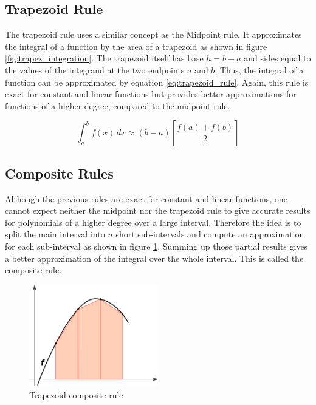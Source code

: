 \subsection{Trapezoid Rule}
The trapezoid rule uses a similar concept as the Midpoint rule. It approximates the integral of a function by the area of a trapezoid as shown in figure \ref{fig:trapez_integration}. The trapezoid itself has base $h = b - a$ and sides equal to the values of the integrand at the two endpoints $a$ and $b$. Thus, the integral of a function can be approximated by equation \ref{eq:trapezoid_rule}. Again, this rule is exact for constant and linear functions but provides better approximations for functions of a higher degree, compared to the midpoint rule.

\begin{equation}
 \int_{a}^{b} f(x)\, dx \approx (b-a) \left[\frac{f(a) + f(b)}{2} \right]
 \label{eq:trapezoid_rule}
\end{equation}



\subsection{Composite Rules}
Although the previous rules are exact for constant and linear functions, one cannot expect neither the midpoint nor the trapezoid rule to give accurate results for polynomials of a higher degree over a large interval. Therefore the idea is to split the main interval into $n$ short sub-intervals and compute an approximation for each sub-interval as shown in figure \ref{fig:trapez_composite}. Summing up those partial results gives a better approximation of the integral over the whole interval. This is called the composite rule. \cite{Skokos2010}

\begin{figure}
\centering
  \includegraphics[width=0.5\textwidth]{graphics/trapez_composite.png}
	\caption{Trapezoid composite rule}
	\label{fig:trapez_composite}
\end{figure}



